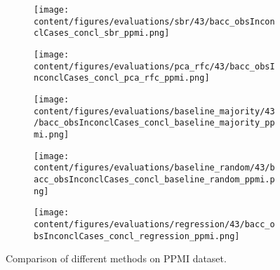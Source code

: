 \begin{figure}[t]
  \begin{subfigure}{0.5\textwidth}
    \centering
    \texttt{[image: content/figures/evaluations/sbr/43/bacc\_obsInconclCases\_concl\_sbr\_ppmi.png]}
  \end{subfigure}
  \hfill
  \begin{subfigure}{0.5\textwidth}
    \centering
    \texttt{[image: content/figures/evaluations/pca\_rfc/43/bacc\_obsInconclCases\_concl\_pca\_rfc\_ppmi.png]}
  \end{subfigure}
  \hfill
  \begin{subfigure}{0.5\textwidth}
    \centering
    \texttt{[image: content/figures/evaluations/baseline\_majority/43/bacc\_obsInconclCases\_concl\_baseline\_majority\_ppmi.png]}
  \end{subfigure}
  \hfill
  \begin{subfigure}{0.5\textwidth}
    \centering
    \texttt{[image: content/figures/evaluations/baseline\_random/43/bacc\_obsInconclCases\_concl\_baseline\_random\_ppmi.png]}
  \end{subfigure}
  \hfill
  \begin{subfigure}{0.5\textwidth}
    \centering
    \texttt{[image: content/figures/evaluations/regression/43/bacc\_obsInconclCases\_concl\_regression\_ppmi.png]}
  \end{subfigure}

  \caption{Comparison of different methods on PPMI dataset.}
  \label{fig:test_ppmi}
\end{figure}




